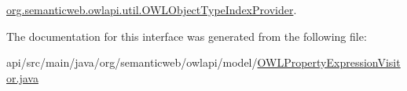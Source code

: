 \hyperlink{classorg_1_1semanticweb_1_1owlapi_1_1util_1_1_o_w_l_object_type_index_provider_a31a71730fe477a1c69b3c1212e885a02}{org.\-semanticweb.\-owlapi.\-util.\-O\-W\-L\-Object\-Type\-Index\-Provider}.



The documentation for this interface was generated from the following file\-:\begin{DoxyCompactItemize}
\item 
api/src/main/java/org/semanticweb/owlapi/model/\hyperlink{_o_w_l_property_expression_visitor_8java}{O\-W\-L\-Property\-Expression\-Visitor.\-java}\end{DoxyCompactItemize}
